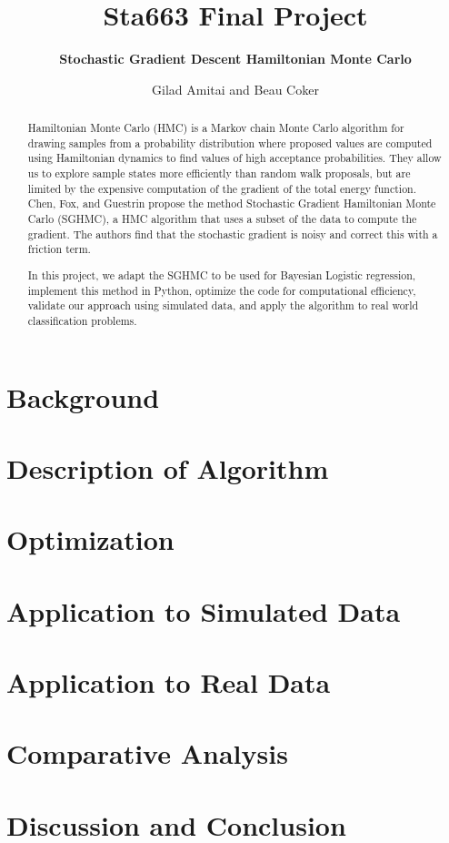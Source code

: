 \documentclass[12pt]{article}
\begin{document}
\vspace{-1in}
\title{\bf Sta663 Final Project}
\author{\bf Stochastic Gradient Descent Hamiltonian Monte Carlo}
\date{Gilad Amitai and Beau Coker}
\maketitle 
\vspace{-0.5in}

\begin{abstract}
	Hamiltonian Monte Carlo (HMC) is a Markov chain Monte Carlo algorithm for drawing samples from a probability distribution where proposed values are computed using Hamiltonian dynamics to find values of high acceptance probabilities. They allow us to explore sample states more efficiently than random walk proposals, but are limited by the expensive computation of the gradient of the total energy function. Chen, Fox, and Guestrin propose the method Stochastic Gradient Hamiltonian Monte Carlo (SGHMC), a HMC algorithm that uses a subset of the data to compute the gradient. The authors find that the stochastic gradient is noisy and correct this with a friction term.

	In this project, we adapt the SGHMC to be used for Bayesian Logistic regression, implement this method in Python, optimize the code for computational efficiency, validate our approach using simulated data, and apply the algorithm to real world classification problems.
\end{abstract}

\section{Background}


\section{Description of Algorithm}


\section{Optimization}


\section{Application to Simulated Data}


\section{Application to Real Data}


\section{Comparative Analysis}


\section{Discussion and Conclusion}

\end{document}
